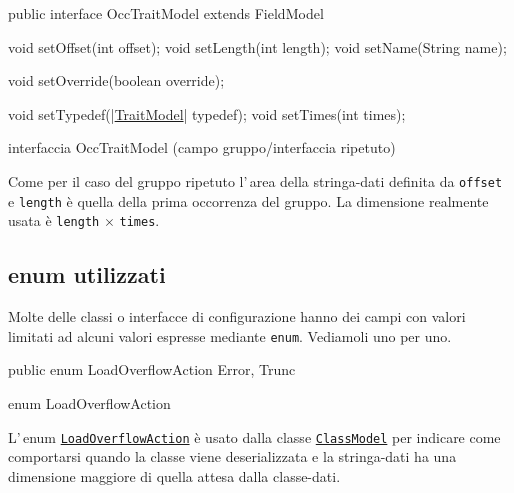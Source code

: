 \documentclass[a4paper,10pt]{report}
\newif\ifesource
\newenvironment{elisting}[1][!htb]
  {\captionsetup{aboveskip=0pt}\begin{listing}[#1]}
  {\end{listing}%
}
\begin{document}
\ifesource
\begin{figure*}[!htb]
\begin{lstlisting}[language=java, 
caption=interfaccia OccTraitModel (campo gruppo/interfaccia ripetuto), 
label=lst:OccTraitModel]
public interface OccTraitModel extends FieldModel {
    void setOffset(int offset);
    void setLength(int length);
    void setName(String name);
    
    void setOverride(boolean override);
    
    void setTypedef((*\hyperref[lst:TraitModel]{TraitModel}*) typedef);
    void setTimes(int times);
}
\end{lstlisting}\index{OccTraitModel}
\end{figure*}
\else
\begin{elisting}
\begin{javacode}
public interface OccTraitModel extends FieldModel {
    void setOffset(int offset);
    void setLength(int length);
    void setName(String name);
    
    void setOverride(boolean override);
    
    void setTypedef(|\hyperref[lst:TraitModel]{TraitModel}| typedef);
    void setTimes(int times);
}
\end{javacode}
\caption{interfaccia OccTraitModel (campo gruppo/interfaccia ripetuto)}
\label{lst:OccTraitModel}
\end{elisting}
\fi
Come per il caso del gruppo ripetuto l'\,area della stringa-dati definita 
da \verb!offset! e \verb!length! è quella della prima occorrenza del gruppo. 
La dimensione realmente usata è \verb!length! $\times$ \verb!times!.

\subsection{enum utilizzati}
Molte delle classi o interfacce di configurazione hanno dei campi con valori
limitati ad alcuni valori espresse mediante \texttt{enum}.
Vediamoli uno per uno.

\ifesource
\begin{lstlisting}[language=java, 
caption=enum LoadOverflowAction, 
label=lst:LoadOverflowAction]
public enum LoadOverflowAction { Error, Trunc }
\end{lstlisting}\index{LoadOverflowAction}
\else
\begin{elisting}
\begin{javacode}
public enum LoadOverflowAction { Error, Trunc }
\end{javacode}
\caption{enum LoadOverflowAction}\label{lst:LoadOverflowAction}
\end{elisting}
\fi
L'\,enum \hyperref[lst:LoadOverflowAction]{\texttt{LoadOverflowAction}} è usato 
dalla classe \hyperref[lst:ClassModel]{\texttt{ClassModel}} per indicare come 
comportarsi quando la classe viene deserializzata e la stringa-dati ha una 
dimensione maggiore di quella attesa dalla classe-dati.
\end{document}
